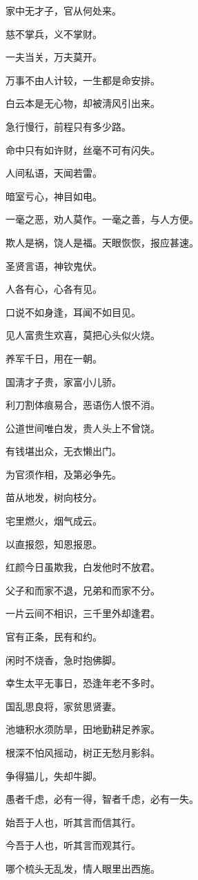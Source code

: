 \documentclass[12pt,oneside]{book}
\begin{document}
家中无才子，官从何处来。

慈不掌兵，义不掌财。

一夫当关，万夫莫开。

万事不由人计较，一生都是命安排。

白云本是无心物，却被淸风引出来。

急行慢行，前程只有多少路。

命中只有如许财，丝毫不可有闪失。

人间私语，天闻若雷。

暗室亏心，神目如电。

一毫之恶，劝人莫作。一毫之善，与人方便。

欺人是祸，饶人是福。天眼恢恢，报应甚速。

圣贤言语，神钦鬼伏。

人各有心，心各有见。

口说不如身逢，耳闻不如目见。

见人富贵生欢喜，莫把心头似火烧。

养军千日，用在一朝。

国淸才子贵，家富小儿骄。

利刀割体痕易合，恶语伤人恨不消。

公道世间唯白发，贵人头上不曾饶。

有钱堪出众，无衣懒出门。

为官须作相，及第必争先。

苗从地发，树向枝分。

宅里燃火，烟气成云。

以直报怨，知恩报恩。

红颜今日虽欺我，白发他时不放君。

父子和而家不退，兄弟和而家不分。

一片云间不相识，三千里外却逢君。

官有正条，民有和约。

闲时不烧香，急时抱佛脚。

幸生太平无事日，恐逢年老不多时。

国乱思良将，家贫思贤妻。

池塘积水须防旱，田地勤耕足养家。

根深不怕风摇动，树正无愁月影斜。

争得猫儿，失却牛脚。

愚者千虑，必有一得，智者千虑，必有一失。

始吾于人也，听其言而信其行。

今吾于人也，听其言而观其行。

哪个梳头无乱发，情人眼里出西施。
\end{document}
